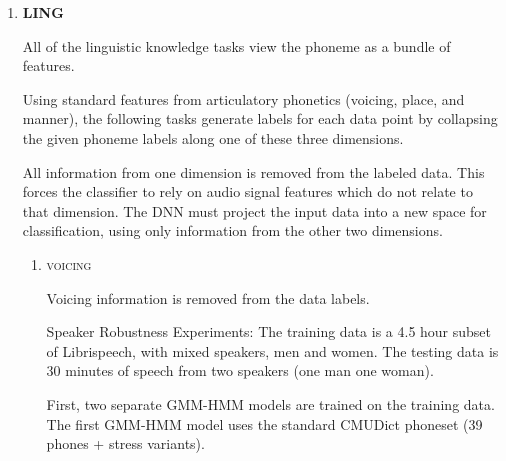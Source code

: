\documentclass[10pt,a4paper]{article}
\begin{document}
\begin{enumerate}
\item \textbf{LING}

  All of the linguistic knowledge tasks view the phoneme as a bundle of features.

  Using standard features from articulatory phonetics (voicing, place, and manner), the following tasks generate labels for each data point by collapsing the given phoneme labels along one of these three dimensions.

  All information from one dimension is removed from the labeled data. This forces the classifier to rely on audio signal features which do not relate to that dimension. The DNN must project the input data into a new space for classification, using only information from the other two dimensions. 

  
  \begin{enumerate}
  \item \textsc{voicing}

    Voicing information is removed from the data labels.

    Speaker Robustness Experiments: The training data is a 4.5 hour subset of Librispeech, with mixed speakers, men and women. The testing data is 30 minutes of speech from two speakers (one man one woman).

    First, two separate GMM-HMM models are trained on the training data. The first GMM-HMM model uses the standard CMUDict phoneset (39 phones + stress variants).



\end{enumerate}
\end{enumerate}
\end{document}
